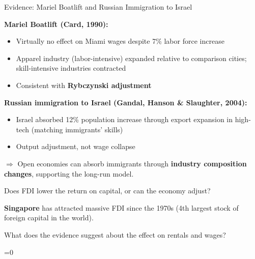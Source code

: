 \documentclass{beamer}
\newcommand{\showanswers}{1}  %
\begin{document}
\begin{frame}{Evidence: Mariel Boatlift and Russian Immigration to Israel}

\textbf{Mariel Boatlift (Card, 1990):}
\begin{itemize}
    \item Virtually no effect on Miami wages despite 7\% labor force increase
    \item Apparel industry (labor-intensive) expanded relative to comparison cities; skill-intensive industries contracted
    \item Consistent with \textbf{Rybczynski adjustment}
\end{itemize}

\vspace{0.3cm}

\textbf{Russian immigration to Israel (Gandal, Hanson \& Slaughter, 2004):}
\begin{itemize}
    \item Israel absorbed 12\% population increase through export expansion in high-tech (matching immigrants' skills)
    \item Output adjustment, not wage collapse
\end{itemize}

\vspace{0.3cm}

$\Rightarrow$ Open economies can absorb immigrants through \textbf{industry composition changes}, supporting the long-run model.

\end{frame}

\fi



\begin{frame}{Does FDI lower the return on capital, or can the economy adjust?}

\textbf{Singapore} has attracted massive FDI since the 1970s (4th largest stock of foreign capital in the world).

\vspace{0.3cm}

What does the evidence suggest about the effect on rentals and wages?

\end{frame}



\ifnum\showanswers=0
\end{document}
